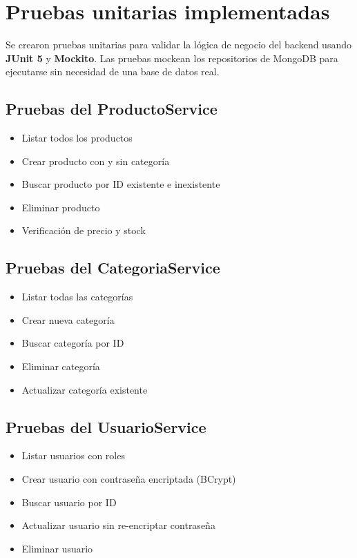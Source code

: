 \documentclass[12pt,a4paper]{article}
\begin{document}
\section{Pruebas unitarias implementadas}

Se crearon pruebas unitarias para validar la lógica de negocio del backend usando \textbf{JUnit 5} y \textbf{Mockito}. Las pruebas mockean los repositorios de MongoDB para ejecutarse sin necesidad de una base de datos real.

\subsection{Pruebas del ProductoService}
\begin{itemize}
    \item Listar todos los productos
    \item Crear producto con y sin categoría
    \item Buscar producto por ID existente e inexistente
    \item Eliminar producto
    \item Verificación de precio y stock
\end{itemize}

\subsection{Pruebas del CategoriaService}
\begin{itemize}
    \item Listar todas las categorías
    \item Crear nueva categoría
    \item Buscar categoría por ID
    \item Eliminar categoría
    \item Actualizar categoría existente
\end{itemize}

\subsection{Pruebas del UsuarioService}
\begin{itemize}
    \item Listar usuarios con roles
    \item Crear usuario con contraseña encriptada (BCrypt)
    \item Buscar usuario por ID
    \item Actualizar usuario sin re-encriptar contraseña
    \item Eliminar usuario
\end{itemize}
\end{document}
